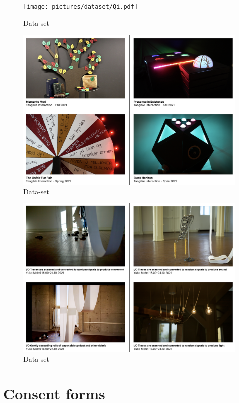 \begin{figure}[H]
\texttt{[image: pictures/dataset/Qi.pdf]}
\centering 
\caption{Data-set}
\end{figure}

\begin{figure}[H]
\includegraphics[width=13cm]{pictures/dataset/tangible.png}
\centering 
\caption{Data-set}
\end{figure}

\begin{figure}[H]
\includegraphics[width=13cm]{pictures/dataset/yuko_mohri.png}
\centering 
\caption{Data-set}
\end{figure}

\section{Consent forms}

